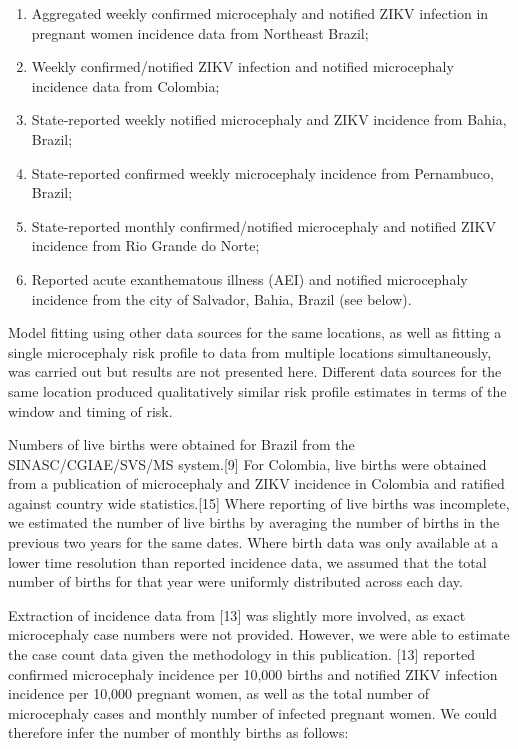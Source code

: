 \documentclass[10pt,letterpaper]{article}
\begin{document}
\begin{enumerate}
\item Aggregated weekly confirmed microcephaly and notified ZIKV infection in pregnant women incidence data from Northeast Brazil; 
\item Weekly confirmed/notified ZIKV infection and notified microcephaly incidence data from Colombia; 
\item State-reported weekly notified microcephaly and ZIKV incidence from Bahia, Brazil; 
\item State-reported confirmed weekly microcephaly incidence from Pernambuco, Brazil; 
\item State-reported monthly confirmed/notified microcephaly and notified ZIKV incidence from Rio Grande do Norte; 
\item Reported acute exanthematous illness (AEI) and notified microcephaly incidence from the city of Salvador, Bahia, Brazil (see below). 
\end{enumerate}

Model fitting using other data sources for the same locations, as well
as fitting a single microcephaly risk profile to data from multiple
locations simultaneously, was carried out but results are not presented
here. Different data sources for the same location produced
qualitatively similar risk profile estimates in terms of the window and
timing of risk.

Numbers of live births were obtained for Brazil from the
SINASC/CGIAE/SVS/MS system.{[}9{]} For Colombia, live births were
obtained from a publication of microcephaly and ZIKV incidence in
Colombia and ratified against country wide statistics.{[}15{]} Where
reporting of live births was incomplete, we estimated the number of live
births by averaging the number of births in the previous two years for
the same dates. Where birth data was only available at a lower time
resolution than reported incidence data, we assumed that the total
number of births for that year were uniformly distributed across each
day.

Extraction of incidence data from {[}13{]} was slightly more involved,
as exact microcephaly case numbers were not provided. However, we were
able to estimate the case count data given the methodology in this
publication. {[}13{]} reported confirmed microcephaly incidence per
10,000 births and notified ZIKV infection incidence per 10,000 pregnant
women, as well as the total number of microcephaly cases and monthly
number of infected pregnant women. We could therefore infer the number
of monthly births as follows:
\end{document}
